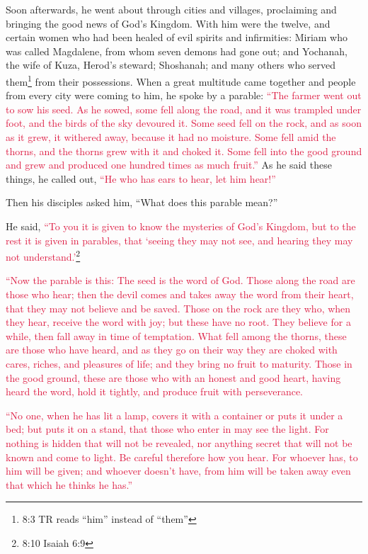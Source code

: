 \mychapter{} \myverse*{}Soon afterwards, he went about through cities and villages, proclaiming
and bringing the good news of God’s Kingdom. With him were the twelve,
\myverse{}and certain women who had been healed of evil spirits and infirmities: Miriam
who was called Magdalene, from whom seven demons had gone out;
\myverse{}and Yochanah, the wife of Kuza, Herod’s steward; Shoshanah; and many others
who served them\footnote{8:3 TR reads “him” instead of “them”} from their possessions.
\myverse{}When a great multitude came together and people from every city were coming
to him, he spoke by a parable:
\myverse{}\textcolor{crimson}{“The farmer went out to sow his seed. As he sowed, some fell along the road,
	and it was trampled under foot, and the birds of the sky devoured it.
}
\myverse{}\textcolor{crimson}{Some seed fell on the rock, and as soon as it grew, it withered away, because
	it had no moisture.
}
\myverse{}\textcolor{crimson}{Some fell amid the thorns, and the thorns grew with it and choked it.
}
\myverse{}\textcolor{crimson}{Some fell into the good ground and grew and produced one hundred times as
	much fruit.”} As he said these things, he called out,
\textcolor{crimson}{“He who has ears to hear, let him hear!”}

\myverse{}Then his disciples asked him, “What does this parable mean?”

\myverse{}He said,
\textcolor{crimson}{“To you it is given to know the mysteries of God’s Kingdom, but to the rest it is given in parables,
	that ‘seeing they may not see, and hearing they may not understand.’}\footnote{ 8:10 Isaiah 6:9}

\myverse{}\textcolor{crimson}{“Now the parable is this: The seed is the word of God.
}
\myverse{}\textcolor{crimson}{Those along the road are those who hear; then the devil comes and takes
	away the word from their heart, that they may not believe and be saved.
}
\myverse{}\textcolor{crimson}{Those on the rock are they who, when they hear, receive the word with
	joy; but these have no root. They believe for a while, then fall away in time of temptation.
}
\myverse{}\textcolor{crimson}{What fell among the thorns, these are those who have heard, and as they
	go on their way they are choked with cares, riches, and pleasures of life; and they bring no fruit to
	maturity.
}
\myverse{}\textcolor{crimson}{Those in the good ground, these are those who with an honest and good
	heart, having heard the word, hold it tightly, and produce fruit with perseverance.}

\myverse{}\textcolor{crimson}{“No one, when he has lit a lamp, covers it with a container
	or puts it under a bed; but puts it on a stand, that those who enter in may see the light.
}
\myverse{}\textcolor{crimson}{For nothing is hidden that will not be revealed, nor anything secret that
	will not be known and come to light.
}
\myverse{}\textcolor{crimson}{Be careful therefore how you hear. For whoever has, to him will be given;
	and whoever doesn’t have, from him will be taken away even that which he thinks he has.”}

